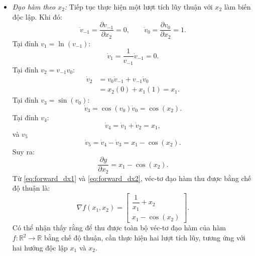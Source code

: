 \begin{itemize}
    \item \textit{Đạo hàm theo $x_2$:}
    Tiếp tục thực hiện một lượt tích lũy thuận với $x_2$ làm biến độc lập. Khi đó:
    \begin{equation}
        \dot{v}_{-1} = \frac{\partial v_{-1}}{\partial x_2} = 0, \qquad \dot{v}_0 = \frac{\partial v_0}{\partial x_2} = 1.
    \end{equation}
    Tại đỉnh $v_1 = \ln(v_{-1})$:
    \begin{equation}
        \dot{v}_1 = \frac{1}{v_{-1}}\dot{v}_{-1} = 0.
    \end{equation}
    Tại đỉnh $v_2 = v_{-1} v_0$:
    \begin{equation}
    \begin{aligned}
        \dot{v}_2 &= v_0\dot{v}_{-1} + v_{-1}\dot{v}_0 \\
        &= x_2(0) + x_1(1) = x_1.
    \end{aligned}
    \end{equation}
    Tại đỉnh $v_3 = \sin(v_0)$:
    \begin{equation}
        \dot{v}_3 = \cos(v_0)\dot{v}_0 = \cos(x_2).
    \end{equation}
    Tại đỉnh $v_4$:
    \begin{equation}
        \dot{v}_4 = \dot{v}_1 + \dot{v}_2 = x_1,
    \end{equation}
    và $v_5$
    \begin{equation}
        \dot{v}_5 = \dot{v}_4 - \dot{v}_3 = x_1 - \cos(x_2).
    \end{equation}
    Suy ra:
    \begin{equation}
        \frac{\partial y}{\partial x_2} = x_1 - \cos(x_2).
        \label{eq:forward_dx2}
    \end{equation}
    Từ \eqref{eq:forward_dx1} và \eqref{eq:forward_dx2}, véc-tơ đạo hàm thu được bằng chế độ thuận là:
    \begin{equation}
        \nabla f(x_1,x_2) = 
        \begin{bmatrix}
            \dfrac{1}{x_1} + x_2 \\[6pt]
            x_1 - \cos(x_2)
        \end{bmatrix}.
        \label{eq:forward_gradient}
    \end{equation}
    Có thể nhận thấy rằng để thu được toàn bộ véc-tơ đạo hàm của hàm $f:\mathbb{R}^2 \rightarrow \mathbb{R}$ bằng chế độ thuận, cần thực hiện hai lượt tích lũy, tương ứng với hai hướng độc lập $x_1$ và $x_2$.
\end{itemize}
